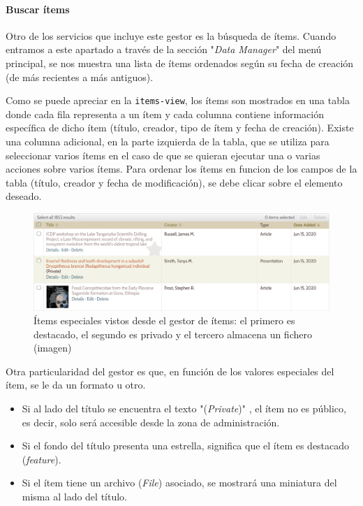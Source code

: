 \documentclass[
]{article}
\providecommand{\tightlist}{%
  \setlength{\itemsep}{0pt}\setlength{\parskip}{0pt}}
\begin{document}
\hypertarget{buscar-uxedtems}{%
\paragraph{Buscar ítems}\label{buscar-uxedtems}}

Otro de los servicios que incluye este gestor es la búsqueda de ítems.
Cuando entramos a este apartado a través de la sección "\emph{Data
Manager}" del menú principal, se nos muestra una lista de ítems
ordenados según su fecha de creación (de más recientes a más antiguos).

Como se puede apreciar en la \texttt{items-view}, los ítems son
mostrados en una tabla donde cada fila representa a un ítem y cada
columna contiene información específica de dicho ítem (título, creador,
tipo de ítem y fecha de creación). Existe una columna adicional, en la
parte izquierda de la tabla, que se utiliza para seleccionar varios
ítems en el caso de que se quieran ejecutar una o varias acciones sobre
varios ítems. Para ordenar los ítems en funcion de los campos de la
tabla (título, creador y fecha de modificación), se debe clicar sobre el
elemento deseado.

\begin{figure}
\hypertarget{special-items-view}{%
\centering
\includegraphics{../_static/images/special-items.png}
\caption{Ítems especiales vistos desde el gestor de ítems: el primero es
destacado, el segundo es privado y el tercero almacena un fichero
(imagen)}\label{special-items-view}
}
\end{figure}

Otra particularidad del gestor es que, en función de los valores
especiales del ítem, se le da un formato u otro.

\begin{itemize}
\tightlist
\item
  Si al lado del título se encuentra el texto "(\emph{Private})" , el
  ítem no es público, es decir, solo será accesible desde la zona de
  administración.
\item
  Si el fondo del título presenta una estrella, significa que el ítem es
  destacado (\emph{feature}).
\item
  Si el ítem tiene un archivo (\emph{File}) asociado, se mostrará una
  miniatura del misma al lado del título.
\end{itemize}
\end{document}
